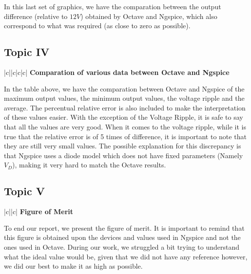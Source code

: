In this last set of graphics, we have the comparation between the output difference (relative to $12V$) obtained by Octave and Ngspice, which also correspond to what was required (as close to zero as possible).

\subsection{Topic IV}
\label{subsec:fourth_topic_error}

\begin{center}
   \begin{tabular}{|c||c|c|c|}
      \hline    
       {\bf Comparation of various data between Octave and Ngspice} \\
      \hline
        
   \end{tabular}
\end{center}

In the table above, we have the comparation between Octave and Ngspice of the maximum output values, the minimum output values, the voltage ripple and the average. The percentual relative error is also included to make the interpretation of these values easier.
With the exception of the Voltage Ripple, it is safe to say that all the values are very good. When it comes to the voltage ripple, while it is true that the relative error is of 5 times of difference, it is important to note that they are still very small values. The possible explanation for this discrepancy is that Ngspice uses a diode model which does not have fixed parameters (Namely $V_{D}$), making it very hard to match the Octave results.

\subsection{Topic V}
\label{subsec:Figure of Merit}

\begin{center}
   \begin{tabular}{|c||c|}
      \hline    
       {\bf Figure of Merit} \\
      \hline
        
   \end{tabular}
 \end{center}

To end our report, we present the figure of merit. It is important to remind that this figure is obtained upon the devices and values used in Ngspice and not the ones used in Octave. During our work, we struggled a bit trying to understand what the ideal value would be, given that we did not have any reference however, we did our best to make it as high as possible.
